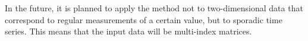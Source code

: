 \documentclass[bst/sn-mathphys]{sn-jnl}%
\theoremstyle{thmstyleone}%
\theoremstyle{thmstyletwo}%
\theoremstyle{thmstylethree}%
\begin{document}
In the future, it is planned to apply the method not to two-dimensional data that correspond to regular measurements of a certain value, but to sporadic time series.
This means that the input data will be multi-index matrices.



\end{document}

